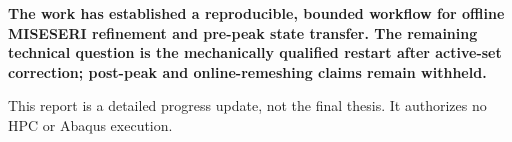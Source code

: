 \documentclass[10pt,a4paper]{article}
\newcommand{\boxx}[2]{\colorbox{#1}{\parbox{\dimexpr\linewidth-2\fboxsep}{#2}}}
\begin{document}
\boxx{pa}{\Large\bfseries The work has established a reproducible, bounded workflow for offline MISESERI refinement and pre-peak state transfer. The remaining technical question is the mechanically qualified restart after active-set correction; post-peak and online-remeshing claims remain withheld.}
\vfill\footnotesize This report is a detailed progress update, not the final thesis. It authorizes no HPC or Abaqus execution.
\end{document}

